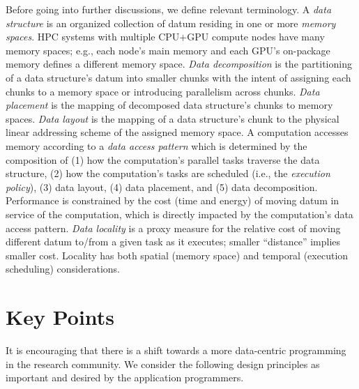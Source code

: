 Before going into further discussions, we define relevant terminology. 
%
%
A {\em data structure} is an organized collection of datum residing in one or more {\em memory spaces}.
%
HPC systems with multiple CPU+GPU compute nodes have many memory spaces; e.g., each node's main memory and each GPU's on-package memory defines a different memory space.
%
{\em Data decomposition} is the partitioning of a data structure's datum into smaller chunks with the intent of assigning each chunks to a memory space or introducing parallelism across chunks. 
%
{\em Data placement} is the mapping of decomposed data structure's chunks to memory spaces.
%
%
{\em Data layout} is the mapping of a data structure's chunk to the physical linear addressing scheme of the assigned memory space.
%
A computation accesses memory according to a {\em data access pattern} which is determined by the composition of (1) how the computation's parallel tasks traverse the data structure,
(2) how the computation's tasks are scheduled (i.e., the {\em execution policy}), 
(3) data layout,
(4) data placement, and
(5) data decomposition.
%
Performance is constrained by the cost (time and energy) of moving datum in service of the computation, which is directly impacted by the computation's data access pattern.
%
{\em Data locality} is a proxy measure for the relative cost of moving different datum to/from a given task as it executes; smaller ``distance'' implies smaller cost.
%
Locality has both spatial (memory space) and temporal (execution scheduling) considerations.

  
  
\section{Key Points}
It is encouraging that there is a shift towards a more data-centric programming in the research community. 
We consider the following design principles as important and desired by the application programmers.

